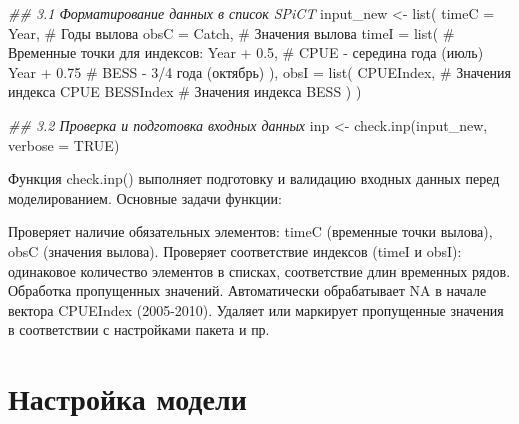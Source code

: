 \documentclass[
  letterpaper,
  DIV=11,
  numbers=noendperiod]{scrreprt}
\newenvironment{Shaded}{\begin{snugshade}}{\end{snugshade}}
\newcommand{\AttributeTok}[1]{\textcolor[rgb]{0.40,0.45,0.13}{#1}}
\newcommand{\CommentTok}[1]{\textcolor[rgb]{0.37,0.37,0.37}{#1}}
\newcommand{\ConstantTok}[1]{\textcolor[rgb]{0.56,0.35,0.01}{#1}}
\newcommand{\DocumentationTok}[1]{\textcolor[rgb]{0.37,0.37,0.37}{\textit{#1}}}
\newcommand{\FloatTok}[1]{\textcolor[rgb]{0.68,0.00,0.00}{#1}}
\newcommand{\FunctionTok}[1]{\textcolor[rgb]{0.28,0.35,0.67}{#1}}
\newcommand{\NormalTok}[1]{\textcolor[rgb]{0.00,0.23,0.31}{#1}}
\newcommand{\OtherTok}[1]{\textcolor[rgb]{0.00,0.23,0.31}{#1}}
\newcommand{\SpecialCharTok}[1]{\textcolor[rgb]{0.37,0.37,0.37}{#1}}
\begin{document}
\begin{Shaded}
\begin{Highlighting}[]
\DocumentationTok{\#\# 3.1 Форматирование данных в список SPiCT}
\NormalTok{input\_new }\OtherTok{\textless{}{-}} \FunctionTok{list}\NormalTok{(}
  \AttributeTok{timeC =}\NormalTok{ Year,     }\CommentTok{\# Годы вылова}
  \AttributeTok{obsC =}\NormalTok{ Catch,     }\CommentTok{\# Значения вылова}
  \AttributeTok{timeI =} \FunctionTok{list}\NormalTok{(     }\CommentTok{\# Временные точки для индексов:}
\NormalTok{    Year }\SpecialCharTok{+} \FloatTok{0.5}\NormalTok{,     }\CommentTok{\#  CPUE {-} середина года (июль)}
\NormalTok{    Year }\SpecialCharTok{+} \FloatTok{0.75}     \CommentTok{\#  BESS {-} 3/4 года (октябрь)}
\NormalTok{  ),}
  \AttributeTok{obsI =} \FunctionTok{list}\NormalTok{(}
\NormalTok{    CPUEIndex,      }\CommentTok{\# Значения индекса CPUE}
\NormalTok{    BESSIndex       }\CommentTok{\# Значения индекса BESS}
\NormalTok{  )}
\NormalTok{)}

\DocumentationTok{\#\# 3.2 Проверка и подготовка входных данных}
\NormalTok{inp }\OtherTok{\textless{}{-}} \FunctionTok{check.inp}\NormalTok{(input\_new, }\AttributeTok{verbose =} \ConstantTok{TRUE}\NormalTok{)}
\end{Highlighting}
\end{Shaded}

Функция check.inp() выполняет подготовку и валидацию входных данных
перед моделированием. Основные задачи функции:

Проверяет наличие обязательных элементов: timeC (временные точки
вылова), obsC (значения вылова). Проверяет соответствие индексов (timeI
и obsI): одинаковое количество элементов в списках, соответствие длин
временных рядов. Обработка пропущенных значений. Автоматически
обрабатывает NA в начале вектора CPUEIndex (2005-2010). Удаляет или
маркирует пропущенные значения в соответствии с настройками пакета и пр.

\section{Настройка
модели}\label{ux43dux430ux441ux442ux440ux43eux439ux43aux430-ux43cux43eux434ux435ux43bux438}
\end{document}
